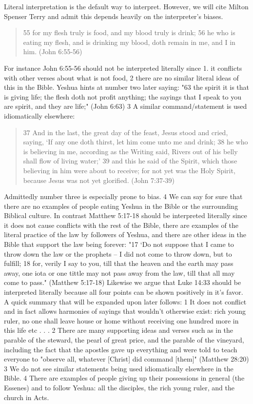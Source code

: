 \documentclass[11pt]{article}
\begin{document}
Literal interpretation is the default way to interpret. However, we will cite Milton Spenser Terry and admit this depends heavily on the interpreter's biases.\cite{mt}
\begin{quote}
55 for my flesh truly is food, and my blood truly is drink; 56 he who is eating my flesh, and is drinking my blood, doth remain in me, and I in him. (John 6:55-56) \end{quote}
For instance John 6:55-56 should not be interpreted literally since 1. it conflicts with other verses about what is not food, 2 there are no similar literal ideas of this in the Bible. Yeshua hints at number two later saying: "63 the spirit it is that is giving life; the flesh doth not profit anything; the sayings that I speak to you are spirit, and they are life;" (John 6:63) 3 A similar command/statement is used idiomatically elsewhere:
\begin{quote}
37 And in the last, the great day of the feast, Jesus stood and cried, saying, `If any one doth thirst, let him come unto me and drink;
38 he who is believing in me, according as the Writing said, Rivers out of his belly shall flow of living water;'
39 and this he said of the Spirit, which those believing in him were about to receive; for not yet was the Holy Spirit, because Jesus was not yet glorified. (John 7:37-39)
\end{quote}
Admittedly number three is especially prone to bias. 4 We can say for sure that there are no examples of people eating Yeshua in the Bible or the surrounding Biblical culture. \newline In contrast Matthew 5:17-18 should be interpreted literally since it does not cause conflicts with the rest of the Bible, there are examples of the literal practice of the law by followers of Yeshua, and there are other ideas in the Bible that support the law being forever:  "17 `Do not suppose that I came to throw down the law or the prophets -- I did not come to throw down, but to fulfill; 18 for, verily I say to you, till that the heaven and the earth may pass away, one iota or one tittle may not pass away from the law, till that all may come to pass." (Matthew 5:17-18) Likewise we argue that Luke 14:33 should be interpreted literally because all four points can be shown positively in it's favor. A quick summary that will be expanded upon later follows: 1 It does not conflict and in fact allows harmonies of sayings that wouldn't otherwise exist: rich young ruler, no one shall leave house or home without receiving one hundred more in this life etc . . . 2 There are many supporting ideas and verses such as in the parable of the steward, the pearl of great price, and the parable of the vineyard, including the fact that the apostles gave up everything and were told to teach everyone to "observe all, whatever [Christ] did command [them]" (Matthew 28:20) 3 We do not see similar statements being used idiomatically elsewhere in the Bible. 4 There are examples of people giving up their possessions in general (the Essenes) and to follow Yeshua: all the disciples, the rich young ruler, and the church in Acts.
\end{document}

